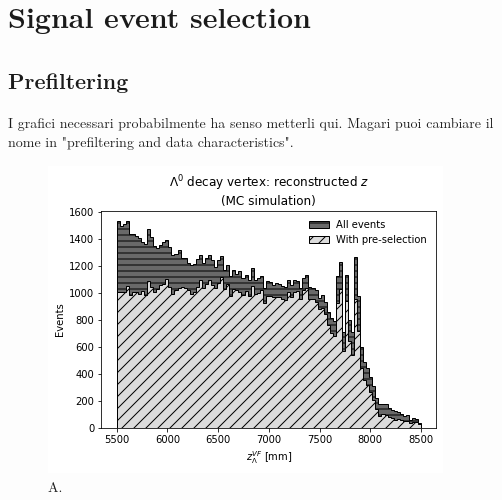 \chapter{Signal event selection}
\label{cap:event_selection}

\section{Prefiltering}
\label{sec:prefilter}
I grafici necessari probabilmente ha senso metterli qui. Magari puoi cambiare il nome in "prefiltering and data characteristics".

\begin{figure}[t]
	\centering
	\includegraphics[width=.6\textwidth]{graphics/04-event_selection/Lambda_endvertex_z.png}
	\caption[Z.]{A.}
\end{figure}

